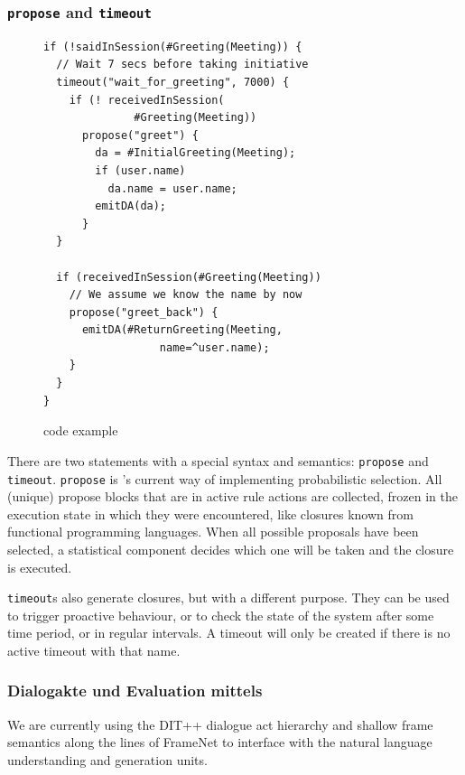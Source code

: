 \subsubsection{\texttt{propose} and \texttt{timeout}}
\begin{figure}[htb]
  \centering\small%
\begin{verbatim}
if (!saidInSession(#Greeting(Meeting)) {
  // Wait 7 secs before taking initiative
  timeout("wait_for_greeting", 7000) {
    if (! receivedInSession(
              #Greeting(Meeting))
      propose("greet") {
        da = #InitialGreeting(Meeting);
        if (user.name)
          da.name = user.name;
        emitDA(da);
      }
  }

  if (receivedInSession(#Greeting(Meeting))
    // We assume we know the name by now
    propose("greet_back") {
      emitDA(#ReturnGreeting(Meeting,
                  name=^user.name);
    }
  }
}
\end{verbatim}\vspace*{-3ex}
  \caption{\vonda code example}
  \label{fig:propose}
\end{figure}

There are two statements with a special syntax and semantics: \texttt{propose}
and \texttt{timeout}. \texttt{propose} is \vonda's current way of implementing
probabilistic selection. All (unique) propose blocks that are in active rule
actions are collected, frozen in the execution state in which they were
encountered, like closures known from functional programming languages. When
all possible proposals have been selected, a statistical component decides
which one will be taken and the closure is executed.

\texttt{timeout}s also generate closures, but with a different purpose. They
can be used to trigger proactive behaviour, or to check the state of the system
after some time period, or in regular intervals. A timeout will only be created
if there is no active timeout with that name.

\subsubsection{Dialogakte und Evaluation mittels \caret}
\label{sec:caret}

We are currently using the DIT++ dialogue act hierarchy \citep{bunt2012iso} and
shallow frame semantics along the lines of FrameNet
\citep{ruppenhofer2016framenet} to interface with the natural language
understanding and generation units.


